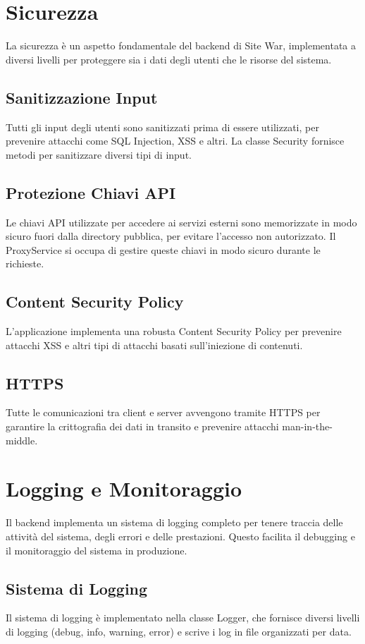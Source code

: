 \section{Sicurezza}
La sicurezza è un aspetto fondamentale del backend di Site War, implementata a diversi livelli per proteggere sia i dati degli utenti che le risorse del sistema.

\subsection{Sanitizzazione Input}
Tutti gli input degli utenti sono sanitizzati prima di essere utilizzati, per prevenire attacchi come SQL Injection, XSS e altri. La classe Security fornisce metodi per sanitizzare diversi tipi di input.

\subsection{Protezione Chiavi API}
Le chiavi API utilizzate per accedere ai servizi esterni sono memorizzate in modo sicuro fuori dalla directory pubblica, per evitare l'accesso non autorizzato. Il ProxyService si occupa di gestire queste chiavi in modo sicuro durante le richieste.

\subsection{Content Security Policy}
L'applicazione implementa una robusta Content Security Policy per prevenire attacchi XSS e altri tipi di attacchi basati sull'iniezione di contenuti.

\subsection{HTTPS}
Tutte le comunicazioni tra client e server avvengono tramite HTTPS per garantire la crittografia dei dati in transito e prevenire attacchi man-in-the-middle.

\section{Logging e Monitoraggio}
Il backend implementa un sistema di logging completo per tenere traccia delle attività del sistema, degli errori e delle prestazioni. Questo facilita il debugging e il monitoraggio del sistema in produzione.

\subsection{Sistema di Logging}
Il sistema di logging è implementato nella classe Logger, che fornisce diversi livelli di logging (debug, info, warning, error) e scrive i log in file organizzati per data.

